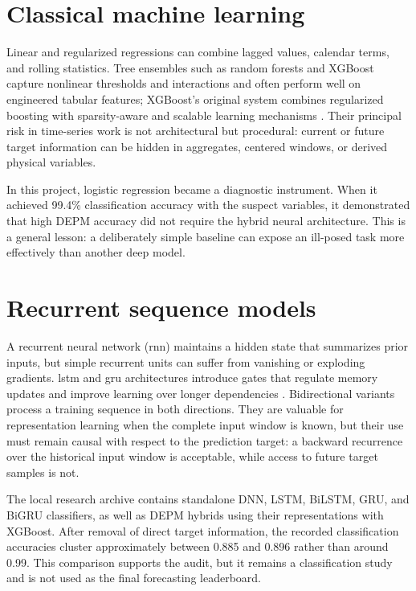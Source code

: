 \section{Classical machine learning}

Linear and regularized regressions can combine lagged values, calendar terms, and rolling statistics. Tree ensembles such as random forests and XGBoost capture nonlinear thresholds and interactions and often perform well on engineered tabular features; XGBoost's original system combines regularized boosting with sparsity-aware and scalable learning mechanisms \cite{chen2016xgboost}. Their principal risk in time-series work is not architectural but procedural: current or future target information can be hidden in aggregates, centered windows, or derived physical variables.

In this project, logistic regression became a diagnostic instrument. When it achieved 99.4\% classification accuracy with the suspect variables, it demonstrated that high DEPM accuracy did not require the hybrid neural architecture. This is a general lesson: a deliberately simple baseline can expose an ill-posed task more effectively than another deep model.

\section{Recurrent sequence models}

A recurrent neural network (\acs{rnn}) maintains a hidden state that summarizes prior inputs, but simple recurrent units can suffer from vanishing or exploding gradients. \ac{lstm} and \ac{gru} architectures introduce gates that regulate memory updates and improve learning over longer dependencies \cite{hochreiter1997lstm,cho2014gru}. Bidirectional variants process a training sequence in both directions. They are valuable for representation learning when the complete input window is known, but their use must remain causal with respect to the prediction target: a backward recurrence over the historical input window is acceptable, while access to future target samples is not.

The local research archive contains standalone DNN, LSTM, BiLSTM, GRU, and BiGRU classifiers, as well as DEPM hybrids using their representations with XGBoost. After removal of direct target information, the recorded classification accuracies cluster approximately between 0.885 and 0.896 rather than around 0.99. This comparison supports the audit, but it remains a classification study and is not used as the final forecasting leaderboard.

